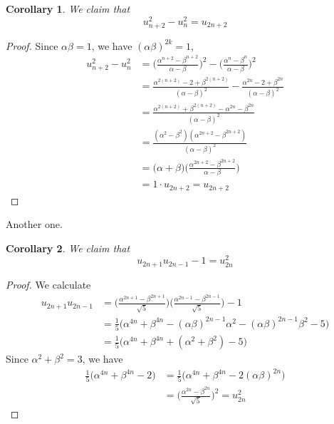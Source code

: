 \documentclass{article}
\newtheorem{corollary}{Corollary}[theorem]
\theoremstyle{remark}
\theoremstyle{definition}
\begin{document}
\begin{corollary}
We claim that
\[u_{n+2}^2 - u_n^2 = u_{2n+2}\]
\end{corollary}
\begin{proof}
Since $\alpha \beta = 1$, we have $(\alpha \beta)^{2k} = 1$, 
\begin{align*}
    u_{n+2}^2 - u_n^2 & = \bigg(\frac{ \alpha^{n+2} - \beta^{n+2}}{\alpha - \beta} \bigg)^2 - \bigg( \frac{\alpha^n - \beta^n}{\alpha - \beta}\bigg)^2 \\
    & = \frac{\alpha^{2(n+2)} - 2 + \beta^{2(n+2)}}{(\alpha - \beta)^2} - \frac{\alpha^{2n} - 2 + \beta^{2n}}{(\alpha - \beta)^2} \\
    & = \frac{\alpha^{2(n+2)} + \beta^{2(n+2)} - \alpha^{2n} - \beta^{2n}}{(\alpha-\beta)^2} \\
    & = \frac{(\alpha^2-\beta^2) (\alpha^{2n+2} - \beta^{2n+2})}{(\alpha-\beta)^2} \\
    & = \big( \alpha + \beta \big) \bigg( \frac{\alpha^{2n+2} - \beta^{2n+2}}{\alpha - \beta} \bigg) \\
    & = 1 \cdot u_{2n+2} = u_{2n+2}
\end{align*}
\end{proof}

Another one. 

\begin{corollary}
We claim that 
\[u_{2n+1} u_{2n-1} - 1 = u_{2n}^2\]
\end{corollary}
\begin{proof}
We calculate
\begin{align*}
    u_{2n+1} u_{2n-1} & = \bigg( \frac{\alpha^{2n+1} - \beta^{2n+1}}{\sqrt{5}}\bigg) \bigg( \frac{\alpha^{2n-1} - \beta^{2n-1}}{\sqrt{5}}\bigg) - 1 \\
    & = \frac{1}{5} \big( \alpha^{4n} + \beta^{4n} - (\alpha \beta)^{2n-1} \alpha^2 - (\alpha \beta)^{2n-1} \beta^2 - 5 \big) \\
    & = \frac{1}{5} \big( \alpha^{4n} + \beta^{4n} + (\alpha^2 + \beta^2) - 5 \big)
\end{align*}
Since $\alpha^2 + \beta^2 = 3$, we have 
\begin{align*}
    \frac{1}{5} \big( \alpha^{4n} + \beta^{4n} - 2 \big) & = \frac{1}{5} \big( \alpha^{4n} + \beta^{4n} - 2 (\alpha \beta)^{2n} \big) \\
    & = \bigg( \frac{\alpha^{2n} - \beta^{2n}}{\sqrt{5}} \bigg)^2 = u_{2n}^2
\end{align*}
\end{proof}
\end{document}
